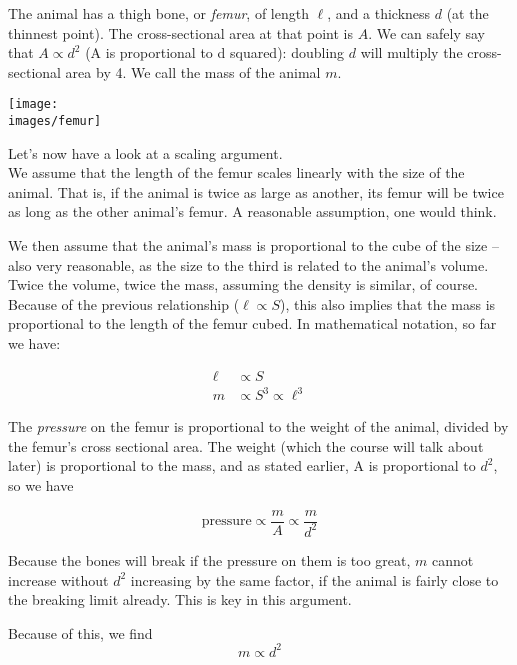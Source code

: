 The animal has a thigh bone, or \emph{femur}, of length $\ell$, and a thickness $d$ (at the thinnest point). The cross-sectional area at that point is $A$. We can safely say that $A \propto d^2$ (A is proportional to d squared): doubling $d$ will multiply the cross-sectional area by 4.
We call the mass of the animal $m$.

\begin{center}
\texttt{[image: \\images/femur]}
\end{center}

Let's now have a look at a scaling argument.\\
We assume that the length of the femur scales linearly with the size of the animal. That is, if the animal is twice as large as another, its femur will be twice as long as the other animal's femur. A reasonable assumption, one would think.

We then assume that the animal's mass is proportional to the cube of the size -- also very reasonable, as the size to the third is related to the animal's volume. Twice the volume, twice the mass, assuming the density is similar, of course.\\
Because of the previous relationship ($\ell \propto S$), this also implies that the mass is proportional to the length of the femur cubed. In mathematical notation, so far we have:

\begin{align}
 \ell &\propto S \label{eq:lproptoS}\\
 m &\propto S^3 \propto \ell^3 \label{eq:mproptoS3}
\end{align}

The \emph{pressure} on the femur is proportional to the weight of the animal, divided by the femur's cross sectional area. The weight (which the course will talk about later) is proportional to the mass, and as stated earlier, A is proportional to $d^2$, so we have

\begin{equation}
 \text{pressure} \propto \frac{m}{A} \propto \frac{m}{d^2}
\end{equation}

Because the bones will break if the pressure on them is too great, $m$ cannot increase without $d^2$ increasing by the same factor, if the animal is fairly close to the breaking limit already. This is key in this argument.

Because of this, we find
\begin{equation}
m \propto d^2 \label{eq:mproptod2}
\end{equation}

